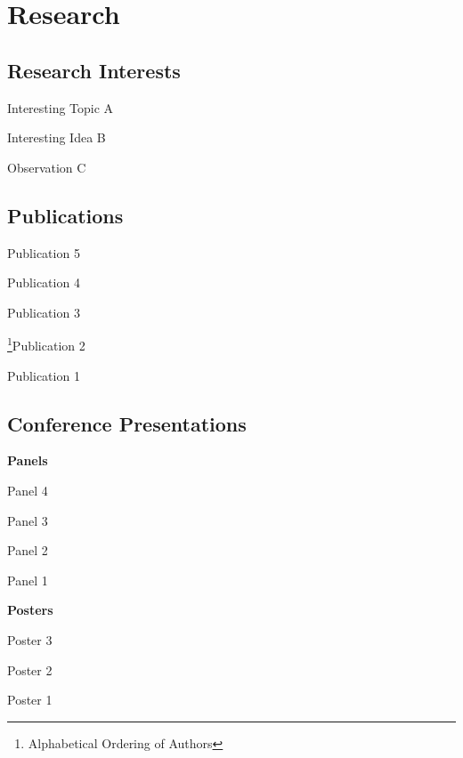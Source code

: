 \documentclass[letterpaper,11pt]{CV} %
\begin{document}

\section{Research}

\subsection{Research Interests}

Interesting Topic A

Interesting Idea B

Observation C

\subsection{Publications}

\begin{etaremune}[topsep = -2pt,itemsep = -2pt, leftmargin=.78cm]
	\item Publication 5
	\item Publication 4
	\item Publication 3
	\item \footnote[2]{\label{alpha}Alphabetical Ordering of Authors}Publication 2
	\item {}Publication 1
\end{etaremune}

\subsection{Conference Presentations}

\textbf{Panels}

\begin{bibenum}
	\item Panel 4
	\item Panel 3
	\item Panel 2
	\item Panel 1
\end{bibenum}


\vspace{0.5cm}

\textbf{Posters}

\begin{etaremune}[topsep = -2pt,itemsep = -2pt, leftmargin=.78cm]
	\item Poster 3
	\item Poster 2
	\item Poster 1
\end{etaremune}
\end{document}
